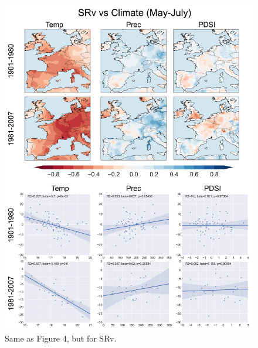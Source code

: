 \documentclass[12pt]{article}
\begin{document}
\begin{figure}
\center
\includegraphics[width=.9\columnwidth,scale=2]{SUPP_fig_10_SRv_MJJ_climate_onedeg.png}
\caption{Same as Figure 4, but for SRv.}
\end{figure}
\end{document}
